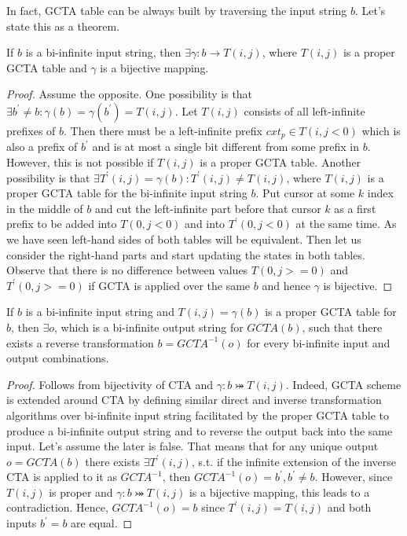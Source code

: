 In fact, GCTA table can be always built by traversing the input string $b$. Let's state this as a theorem.

\begin{theorem}If $b$ is a bi-infinite input string, then $\exists \gamma: b \rightarrow T(i,j)$, where $T(i,j)$ is a proper GCTA table and $\gamma$ is a bijective mapping.\end{theorem}

\begin{proof}Assume the opposite. One possibility is that $\exists b^\prime \neq b: \gamma(b) = \gamma(b^\prime) = T(i,j)$. Let $T(i,j)$ consists of all left-infinite prefixes of $b$. Then there must be a left-infinite prefix $cxt_p \in T(i,j<0)$ which is also a prefix of $b^\prime$ and is at most a single bit different from some prefix in $b$. However, this is not possible if $T(i,j)$ is a proper GCTA table. Another possibility is that $\exists T^\prime(i,j) = \gamma(b): T^\prime(i,j) \neq T(i,j)$, where $T(i,j)$ is a proper GCTA table for the bi-infinite input string $b$. Put cursor at some $k$ index in the middle of $b$ and cut the left-infinite part before that cursor $k$ as a first prefix to be added into $T(0,j<0)$ and into $T^\prime(0,j<0)$ at the same time. As we have seen left-hand sides of both tables will be equivalent. Then let us consider the right-hand parts and start updating the states in both tables. Observe that there is no difference between values $T(0,j>=0)$ and $T^\prime(0,j>=0)$ if GCTA is applied over the same $b$ and hence $\gamma$ is bijective.\end{proof}

\begin{corollary}If $b$ is a bi-infinite input string and $T(i,j)=\gamma(b)$ is a proper GCTA table for $b$, then $\exists o$, which is a bi-infinite output string for $GCTA(b)$, such that there exists a reverse transformation $b=GCTA^{-1}(o)$ for every bi-infinite input and output combinations.\end{corollary}
\begin{proof}Follows from bijectivity of CTA and $\gamma: b \bij T(i,j)$. Indeed, GCTA scheme is extended around CTA by defining similar direct and inverse transformation algorithms over bi-infinite input string facilitated by the proper GCTA table to produce a bi-infinite output string and to reverse the output back into the same input. Let's assume the later is false. That means that for any unique output $o = GCTA(b)$ there exists $\exists T^\prime(i,j)$, s.t. if the infinite extension of the inverse CTA is applied to it as $GCTA^{-1}$, then $GCTA^{-1}(o) = b^\prime, b^\prime \neq b$. However, since $T(i,j)$ is proper and $\gamma: b \bij T(i,j)$ is a bijective mapping, this leads to a contradiction. Hence, $GCTA^{-1}(o) = b$ since $T^\prime(i,j) = T(i,j)$ and both inputs $b^\prime = b$ are equal.\end{proof}

